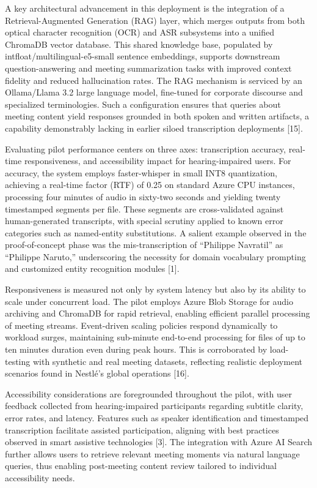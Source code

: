 \documentclass[12pt,a4paper]{article}
\begin{document}
A key architectural advancement in this deployment is the integration of a Retrieval-Augmented Generation (RAG) layer, which merges outputs from both optical character recognition (OCR) and ASR subsystems into a unified ChromaDB vector database. This shared knowledge base, populated by intfloat/multilingual-e5-small sentence embeddings, supports downstream question-answering and meeting summarization tasks with improved context fidelity and reduced hallucination rates. The RAG mechanism is serviced by an Ollama/Llama 3.2 large language model, fine-tuned for corporate discourse and specialized terminologies. Such a configuration ensures that queries about meeting content yield responses grounded in both spoken and written artifacts, a capability demonstrably lacking in earlier siloed transcription deployments [15].


Evaluating pilot performance centers on three axes: transcription accuracy, real-time responsiveness, and accessibility impact for hearing-impaired users. For accuracy, the system employs faster-whisper in small INT8 quantization, achieving a real-time factor (RTF) of 0.25 on standard Azure CPU instances, processing four minutes of audio in sixty-two seconds and yielding twenty timestamped segments per file. These segments are cross-validated against human-generated transcripts, with special scrutiny applied to known error categories such as named-entity substitutions. A salient example observed in the proof-of-concept phase was the mis-transcription of “Philippe Navratil” as “Philippe Naruto,” underscoring the necessity for domain vocabulary prompting and customized entity recognition modules [1].


Responsiveness is measured not only by system latency but also by its ability to scale under concurrent load. The pilot employs Azure Blob Storage for audio archiving and ChromaDB for rapid retrieval, enabling efficient parallel processing of meeting streams. Event-driven scaling policies respond dynamically to workload surges, maintaining sub-minute end-to-end processing for files of up to ten minutes duration even during peak hours. This is corroborated by load-testing with synthetic and real meeting datasets, reflecting realistic deployment scenarios found in Nestlé’s global operations [16].


Accessibility considerations are foregrounded throughout the pilot, with user feedback collected from hearing-impaired participants regarding subtitle clarity, error rates, and latency. Features such as speaker identification and timestamped transcription facilitate assisted participation, aligning with best practices observed in smart assistive technologies [3]. The integration with Azure AI Search further allows users to retrieve relevant meeting moments via natural language queries, thus enabling post-meeting content review tailored to individual accessibility needs.
\end{document}
